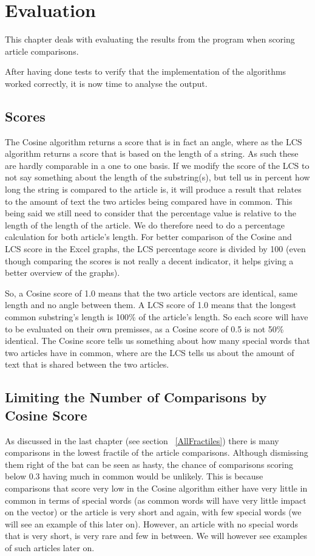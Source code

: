 \chapter{Evaluation}
This chapter deals with evaluating the results from the program when scoring article comparisons.

After having done tests to verify that the implementation of the algorithms worked correctly, it is now time to analyse the output.

\section{Scores}

The Cosine algorithm returns a score that is in fact an angle, where as the LCS algorithm returns a score that is based on the length of a string. As such these are hardly comparable in a one to one basis. If we modify the score of the LCS to not say something about the length of the substring(s), but tell us in percent how long the string is compared to the article is, it will produce a result that relates to the amount of text the two articles being compared have in common. This being said we still need to consider that the percentage value is relative to the length of the length of the article. We do therefore need to do a percentage calculation for both article's length. For better comparison of the Cosine and LCS score in the Excel graphs, the LCS percentage score is divided by 100 (even though comparing the scores is not really a decent indicator, it helps giving a better overview of the graphs).

So, a Cosine score of 1.0 means that the two article vectors are identical, same length and no angle between them. A LCS score of 1.0 means that the longest common substring's length is 100\% of the article's length. So each score will have to be evaluated on their own premisses, as a Cosine score of 0.5 is not 50\% identical. The Cosine score tells us something about how many special words that two articles have in common, where are the LCS tells us about the amount of text that is shared between the two articles.

\section{Limiting the Number of Comparisons by Cosine Score}

As discussed in the last chapter (see section ~\ref{AllFractiles}) there is many comparisons in the lowest fractile of the article comparisons. Although dismissing them right of the bat can be seen as hasty, the chance of comparisons scoring below 0.3 having much in common would be unlikely. This is because comparisons that score very low in the Cosine algorithm either have very little in common in terms of special words (as common words will have very little impact on the vector) or the article is very short and again, with few special words (we will see an example of this later on). However, an article with no special words that is very short, is very rare and few in between. We will however see examples of such articles later on.

